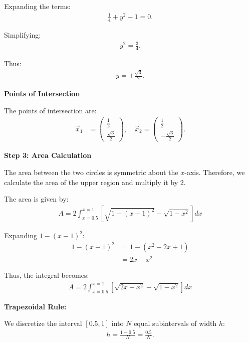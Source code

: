 \documentclass[journal]{IEEEtran}
\begin{document}
Expanding the terms:
\begin{align}
    \frac{1}{4} + y^2 - 1 = 0.
\end{align}

Simplifying:
\begin{align}
    y^2 = \frac{3}{4}.
\end{align}

Thus:
\begin{align}
    y = \pm \frac{\sqrt{3}}{2}.
\end{align}

\textbf{ Points of Intersection}

The points of intersection are:
\begin{align}
    \vec{x}_1 &= \begin{pmatrix} \frac{1}{2} \\ \frac{\sqrt{3}}{2} \end{pmatrix}, \quad
    \vec{x}_2 = \begin{pmatrix} \frac{1}{2} \\ -\frac{\sqrt{3}}{2} \end{pmatrix}.
\end{align}


\textbf{Step 3: Area Calculation}

The area between the two circles is symmetric about the $x$-axis. Therefore, we calculate the area of the upper region and multiply it by $2$.


The area is given by:
\begin{align}
    A = 2 \int_{x=0.5}^{x=1} \left[ \sqrt{1 - (x - 1)^2} - \sqrt{1 - x^2} \right] dx
\end{align}

Expanding $1 - (x - 1)^2$:
\begin{align}
    1 - (x - 1)^2 &= 1 - (x^2 - 2x + 1) \\
    &= 2x - x^2
\end{align}

Thus, the integral becomes:
\begin{align}
    A = 2 \int_{x=0.5}^{x=1} \left[ \sqrt{2x - x^2} - \sqrt{1 - x^2} \right] dx
\end{align}

\textbf{Trapezoidal Rule:}

We discretize the interval $[0.5, 1]$ into $N$ equal subintervals of width $h$:
\begin{align}
    h = \frac{1 - 0.5}{N} = \frac{0.5}{N}.
\end{align}
\end{document}
